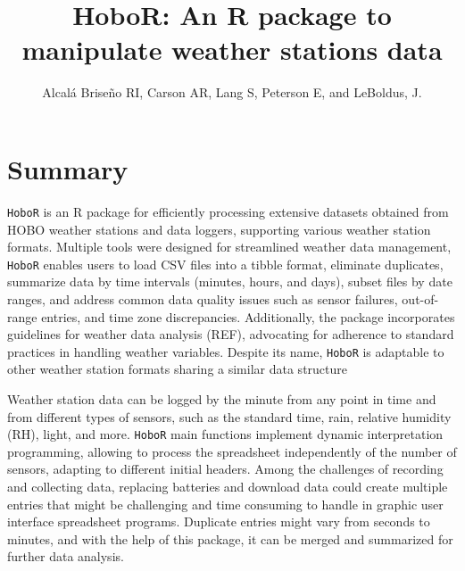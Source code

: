 \documentclass[11pt, oneside]{article}   	%
\title{HoboR: An R package to manipulate weather stations data}
\author{Alcal\'a Brise\~no RI, Carson AR, Lang S,  Peterson E,  and LeBoldus, J.}
\begin{document}
\maketitle
\section*{Summary}

\verb|HoboR| is an R package for efficiently processing extensive datasets obtained from HOBO weather stations and data loggers, supporting various weather station formats. Multiple tools were designed for streamlined weather data management, \verb|HoboR| enables users to load CSV files into a tibble format, eliminate duplicates, summarize data by time intervals (minutes, hours, and days), subset files by date ranges, and address common data quality issues such as sensor failures, out-of-range entries, and time zone discrepancies. Additionally, the package incorporates guidelines for weather data analysis (REF), advocating for adherence to standard practices in handling weather variables. Despite its name, \verb|HoboR| is adaptable to other weather station formats sharing a similar data structure


Weather station data can be logged by the minute from any point in time and from different types of sensors, such as the standard time, rain, relative humidity (RH), light, and more. \verb|HoboR| main functions implement dynamic interpretation programming, allowing to process the spreadsheet independently of the number of sensors, adapting to different initial headers. Among the challenges of recording and collecting data, replacing batteries and download data could create multiple entries that might be challenging and time consuming to handle in graphic user interface spreadsheet programs. Duplicate entries might vary from seconds to minutes, and with the help of this package, it can be merged and summarized for further data analysis.
\end{document}
